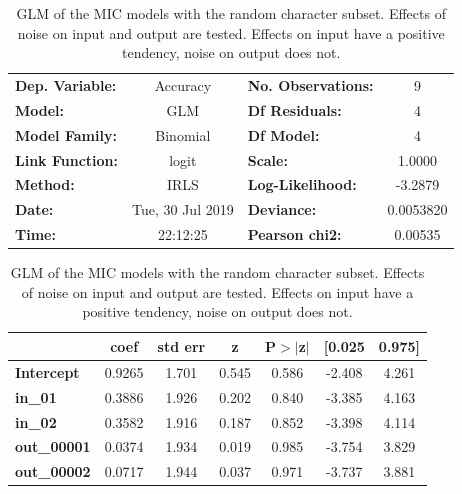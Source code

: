 \documentclass{article}
\begin{document}
\begin{table}[!htb]
	\centering
	\caption{GLM of the MIC models with the random character subset. Effects of noise on input and output are tested. Effects on input have a positive tendency, noise on output does not.}
	\begin{tabular}{lclc}
		\toprule
		\textbf{Dep. Variable:} &     Accuracy     & \textbf{  No. Observations:  } &        9    \\
		\textbf{Model:}         &       GLM        & \textbf{  Df Residuals:      } &        4    \\
		\textbf{Model Family:}  &     Binomial     & \textbf{  Df Model:          } &        4    \\
		\textbf{Link Function:} &      logit       & \textbf{  Scale:             } &    1.0000   \\
		\textbf{Method:}        &       IRLS       & \textbf{  Log-Likelihood:    } &   -3.2879   \\
		\textbf{Date:}          & Tue, 30 Jul 2019 & \textbf{  Deviance:          } & 0.0053820   \\
		\textbf{Time:}          &     22:12:25     & \textbf{  Pearson chi2:      } &  0.00535    \\
		\bottomrule
	\end{tabular}
	\begin{tabular}{lcccccc}
		& \textbf{coef} & \textbf{std err} & \textbf{z} & \textbf{P$>$$|$z$|$} & \textbf{[0.025} & \textbf{0.975]}  \\
		\midrule
		\textbf{Intercept}  &       0.9265  &        1.701     &     0.545  &         0.586        &       -2.408    &        4.261     \\
		\textbf{in\_01}     &       0.3886  &        1.926     &     0.202  &         0.840        &       -3.385    &        4.163     \\
		\textbf{in\_02}     &       0.3582  &        1.916     &     0.187  &         0.852        &       -3.398    &        4.114     \\
		\textbf{out\_00001} &       0.0374  &        1.934     &     0.019  &         0.985        &       -3.754    &        3.829     \\
		\textbf{out\_00002} &       0.0717  &        1.944     &     0.037  &         0.971        &       -3.737    &        3.881     \\
		\bottomrule
	\end{tabular}
	\label{table:Chars_random_GLM}
\end{table}
\end{document}
